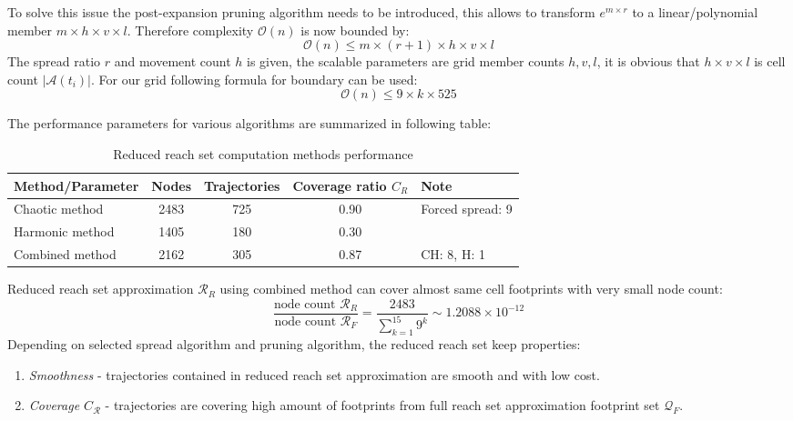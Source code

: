 To solve this issue the post-expansion pruning algorithm needs to be introduced, this allows to transform $e^{m \times r}$ to a linear/polynomial member $m  \times h \times v \times l$. Therefore complexity $\mathscr{O}(n)$ is now bounded by: 
\begin{equation}
    \mathscr{O}(n) \le m\times (r+1)\times h\times v\times l
\end{equation}
The spread ratio $r$ and movement count $h$ is given, the scalable parameters are grid member counts $h,v,l$, it is obvious that $h\times v \times  l$ is cell count $|\mathscr{A}(t_i)|$. For our grid following formula for boundary can be used:
\begin{equation}
    \mathscr{O}(n) \le 9\times k \times 525
\end{equation}

\noindent The performance parameters for various algorithms are summarized in following table:
\begin{table}[H]
    \centering
    \begin{tabularx}{\textwidth}{l||cccX}
    
    Method/Parameter & Nodes & Trajectories & Coverage ratio $C_R$ & Note\\\hline\hline
    Chaotic method& 2483 & 725 & 0.90 & Forced spread: 9\\
    Harmonic method& 1405 & 180 & 0.30 & \\
    Combined method& 2162 & 305 & 0.87 & CH: 8, H: 1\\
    \end{tabularx} 
    \caption{Reduced reach set computation methods performance}
    \label{tab:RRMethodsPerformanceComparison}
\end{table}

\noindent Reduced reach set approximation $\mathscr{R}_R$ using combined method can cover almost same cell footprints with very small node count:
\begin{equation}
    \frac{\text{node count } \mathscr{R}_R}{\text{node count } \mathscr{R}_F} = \frac{2483}{\sum_{k=1}^{15} 9^k}\sim 1.2088 \times 10^{-12}
\end{equation}
\noindent Depending on selected spread algorithm and pruning algorithm, the reduced reach set keep properties:
\begin{enumerate}
    \item \textit{Smoothness} - trajectories contained in reduced reach set approximation are smooth and with low cost.
    \item \textit{Coverage $C_\mathscr{R}$} - trajectories are covering high amount of footprints from full reach set approximation footprint set $\mathscr{Q}_F$.
\end{enumerate}


